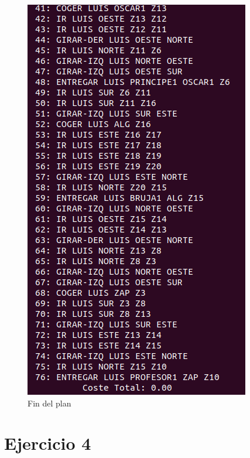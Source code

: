 \begin{figure}[H]
\begin{minipage}[b]{0.5\linewidth}
		\includegraphics[width=\linewidth]{ej3-2.png}
		\caption{Fin del plan}
		\label{fig:ej3-2}
	\end{minipage}
\end{figure}

\section{Ejercicio 4}


